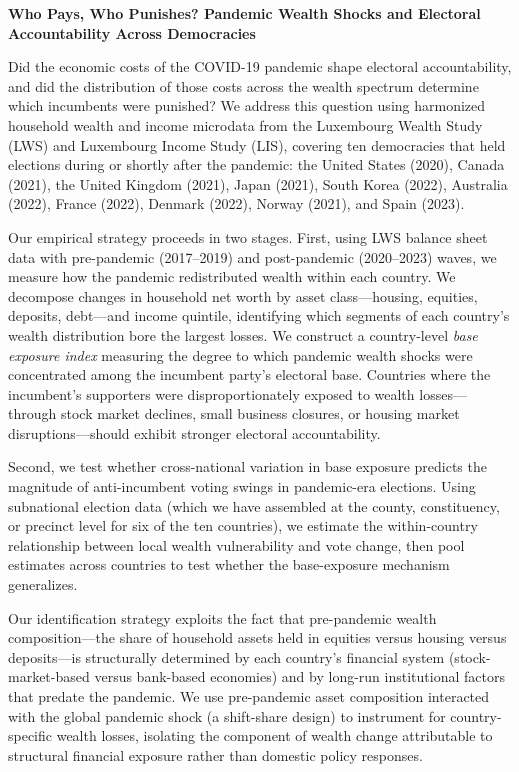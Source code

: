 
\textbf{Who Pays, Who Punishes? Pandemic Wealth Shocks and Electoral Accountability Across Democracies}

\bigskip

Did the economic costs of the COVID-19 pandemic shape electoral accountability, and did the distribution of those costs across the wealth spectrum determine which incumbents were punished? We address this question using harmonized household wealth and income microdata from the Luxembourg Wealth Study (LWS) and Luxembourg Income Study (LIS), covering ten democracies that held elections during or shortly after the pandemic: the United States (2020), Canada (2021), the United Kingdom (2021), Japan (2021), South Korea (2022), Australia (2022), France (2022), Denmark (2022), Norway (2021), and Spain (2023).

Our empirical strategy proceeds in two stages. First, using LWS balance sheet data with pre-pandemic (2017--2019) and post-pandemic (2020--2023) waves, we measure how the pandemic redistributed wealth within each country. We decompose changes in household net worth by asset class---housing, equities, deposits, debt---and income quintile, identifying which segments of each country's wealth distribution bore the largest losses. We construct a country-level \textit{base exposure index} measuring the degree to which pandemic wealth shocks were concentrated among the incumbent party's electoral base. Countries where the incumbent's supporters were disproportionately exposed to wealth losses---through stock market declines, small business closures, or housing market disruptions---should exhibit stronger electoral accountability.

Second, we test whether cross-national variation in base exposure predicts the magnitude of anti-incumbent voting swings in pandemic-era elections. Using subnational election data (which we have assembled at the county, constituency, or precinct level for six of the ten countries), we estimate the within-country relationship between local wealth vulnerability and vote change, then pool estimates across countries to test whether the base-exposure mechanism generalizes.

Our identification strategy exploits the fact that pre-pandemic wealth composition---the share of household assets held in equities versus housing versus deposits---is structurally determined by each country's financial system (stock-market-based versus bank-based economies) and by long-run institutional factors that predate the pandemic. We use pre-pandemic asset composition interacted with the global pandemic shock (a shift-share design) to instrument for country-specific wealth losses, isolating the component of wealth change attributable to structural financial exposure rather than domestic policy responses.

